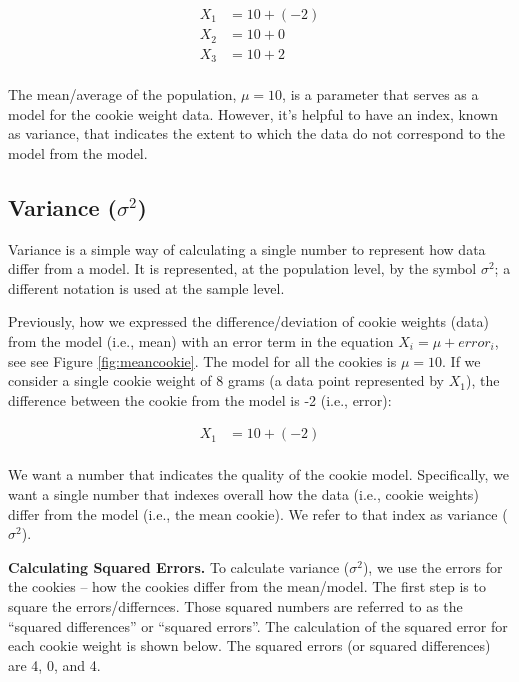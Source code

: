 \documentclass[
]{krantz}
\begin{document}
\[
\begin{aligned} 
X_1 &= 10 + (-2) \\
X_2 &= 10 + 0 \\
X_3 &= 10 + 2 \\
\end{aligned} 
\]

The mean/average of the population, \(\mu = 10\), is a parameter that serves as a model for the cookie weight data. However, it's helpful to have an index, known as variance, that indicates the extent to which the data do not correspond to the model from the model.

\hypertarget{variance-sigma2}{%
\subsection{\texorpdfstring{Variance (\(\sigma^2\))}{Variance (\textbackslash sigma\^{}2)}}\label{variance-sigma2}}

Variance is a simple way of calculating a single number to represent how data differ from a model. It is represented, at the population level, by the symbol \(\sigma^2\); a different notation is used at the sample level.

Previously, how we expressed the difference/deviation of cookie weights (data) from the model (i.e., mean) with an error term in the equation \(X_i = \mu +error_i\), see see Figure \ref{fig:meancookie}. The model for all the cookies is \(\mu = 10\). If we consider a single cookie weight of 8 grams (a data point represented by \(X_1\)), the difference between the cookie from the model is -2 (i.e., error):

\[
\begin{aligned} 
X_1 &= 10 + (-2) \\
\end{aligned} 
\]

We want a number that indicates the quality of the cookie model. Specifically, we want a single number that indexes overall how the data (i.e., cookie weights) differ from the model (i.e., the mean cookie). We refer to that index as variance (\(\sigma^2\)).

\textbf{Calculating Squared Errors.} To calculate variance (\(\sigma^2\)), we use the errors for the cookies -- how the cookies differ from the mean/model. The first step is to square the errors/differnces. Those squared numbers are referred to as the ``squared differences'' or ``squared errors''. The calculation of the squared error for each cookie weight is shown below. The squared errors (or squared differences) are 4, 0, and 4.
\end{document}
